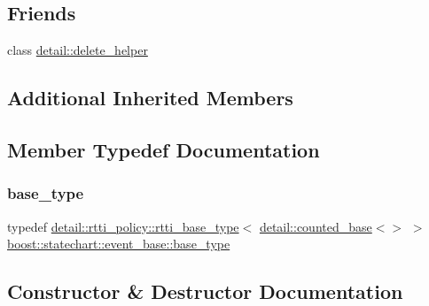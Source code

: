 \subsection*{Friends}
\begin{DoxyCompactItemize}
\item 
class \mbox{\hyperlink{classboost_1_1statechart_1_1event__base_a31bef395a8bdf9cce657750be1b04f49}{detail\+::delete\+\_\+helper}}
\end{DoxyCompactItemize}
\subsection*{Additional Inherited Members}


\subsection{Member Typedef Documentation}
\mbox{\label{classboost_1_1statechart_1_1event__base_a61d8032630b4713b360b5612ee1c919f}} 
\subsubsection{\texorpdfstring{base\+\_\+type}{base\_type}}
{\footnotesize\ttfamily typedef \mbox{\hyperlink{classboost_1_1statechart_1_1detail_1_1rtti__policy_1_1rtti__base__type}{detail\+::rtti\+\_\+policy\+::rtti\+\_\+base\+\_\+type}}$<$ \mbox{\hyperlink{classboost_1_1statechart_1_1detail_1_1counted__base}{detail\+::counted\+\_\+base}}$<$$>$ $>$ \mbox{\hyperlink{classboost_1_1statechart_1_1event__base_a61d8032630b4713b360b5612ee1c919f}{boost\+::statechart\+::event\+\_\+base\+::base\+\_\+type}}\hspace{0.3cm}{\ttfamily [private]}}



\subsection{Constructor \& Destructor Documentation}
\mbox{\label{classboost_1_1statechart_1_1event__base_af6214681a50f4ee80d54dfe43d478d4b}} 
